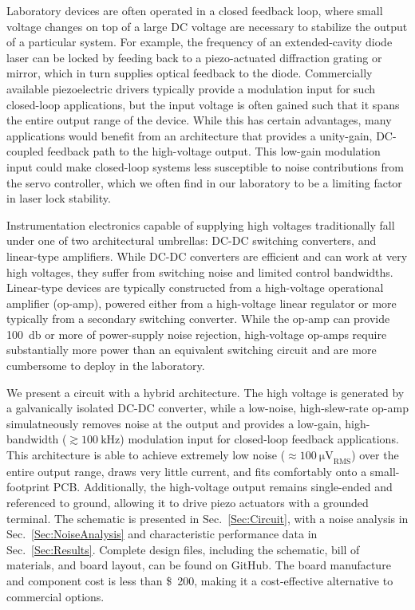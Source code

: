 \documentclass[aip,rsi,reprint]{revtex4-1} %
\begin{document}
Laboratory devices are often operated in a closed feedback loop, where small voltage changes on top of a large DC voltage are necessary to stabilize the output of a particular system.
For example, the frequency of an extended-cavity diode laser can be locked by feeding back to a piezo-actuated diffraction grating or mirror, which in turn supplies optical feedback to the diode.
Commercially available piezoelectric drivers typically provide a modulation input for  such closed-loop applications, but  the input voltage is often gained such that it spans the entire output range of the device.
While this has certain advantages, many applications would benefit from an architecture that provides a unity-gain, DC-coupled feedback path to the high-voltage output. 
This low-gain modulation input could make closed-loop systems less susceptible to noise contributions from the servo controller, which we often find in our laboratory to be a limiting factor in laser lock stability.

Instrumentation electronics capable of supplying high voltages traditionally fall under one of two architectural umbrellas: DC-DC switching converters, and linear-type amplifiers.
While DC-DC converters are efficient and can work at very high voltages, they suffer from switching noise and limited control bandwidths.
Linear-type devices are typically constructed from a high-voltage operational amplifier (op-amp), powered either from a high-voltage linear regulator or more typically from a secondary switching converter.
While the op-amp can provide \SI{100}{\decibel} or more of power-supply noise rejection\cite{PA84Datasheet}, high-voltage op-amps require substantially more power than an equivalent switching circuit and are more cumbersome to deploy in the laboratory.

We present a circuit with a hybrid architecture.
The high voltage is generated by a galvanically isolated DC-DC converter, while a low-noise, high-slew-rate op-amp simulatneously removes noise at the output and provides a low-gain, high-bandwidth ($\gtrsim \SI{100}{\kilo\hertz}$) modulation input for closed-loop feedback applications.
This architecture is able to achieve extremely low noise ($\approx\SI{100}{\micro\volt}_{\text{RMS}}$) over the entire output range, draws very little current, and fits comfortably onto a small-footprint PCB.
Additionally, the high-voltage output remains single-ended and referenced to ground, allowing it to drive piezo actuators with a grounded terminal.
The schematic is presented in Sec.~\ref{Sec:Circuit}, with a noise analysis in Sec.~\ref{Sec:NoiseAnalysis} and characteristic performance data in Sec.~\ref{Sec:Results}.
Complete design files, including the schematic, bill of materials, and board layout, can be found on GitHub.\cite{PiezoDesignFiles}
The board manufacture and component cost is less than \SI{200}[\$]{}, making it a cost-effective alternative to commercial options. 
\end{document}
